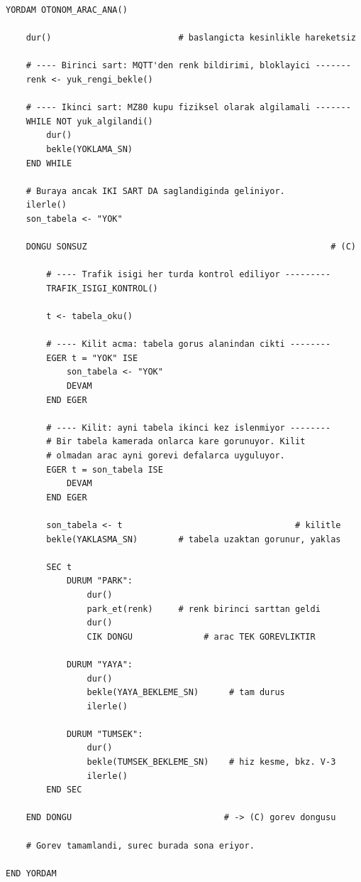 \documentclass[11pt,a4paper]{article}
\begin{document}
\begin{verbatim}
YORDAM OTONOM_ARAC_ANA()

    dur()                         # baslangicta kesinlikle hareketsiz

    # ---- Birinci sart: MQTT'den renk bildirimi, bloklayici -------
    renk <- yuk_rengi_bekle()

    # ---- Ikinci sart: MZ80 kupu fiziksel olarak algilamali -------
    WHILE NOT yuk_algilandi()
        dur()
        bekle(YOKLAMA_SN)
    END WHILE

    # Buraya ancak IKI SART DA saglandiginda geliniyor.
    ilerle()
    son_tabela <- "YOK"

    DONGU SONSUZ                                                # (C)

        # ---- Trafik isigi her turda kontrol ediliyor ---------
        TRAFIK_ISIGI_KONTROL()

        t <- tabela_oku()

        # ---- Kilit acma: tabela gorus alanindan cikti --------
        EGER t = "YOK" ISE
            son_tabela <- "YOK"
            DEVAM
        END EGER

        # ---- Kilit: ayni tabela ikinci kez islenmiyor --------
        # Bir tabela kamerada onlarca kare gorunuyor. Kilit
        # olmadan arac ayni gorevi defalarca uyguluyor.
        EGER t = son_tabela ISE
            DEVAM
        END EGER

        son_tabela <- t                                  # kilitle
        bekle(YAKLASMA_SN)        # tabela uzaktan gorunur, yaklas

        SEC t
            DURUM "PARK":
                dur()
                park_et(renk)     # renk birinci sarttan geldi
                dur()
                CIK DONGU              # arac TEK GOREVLIKTIR

            DURUM "YAYA":
                dur()
                bekle(YAYA_BEKLEME_SN)      # tam durus
                ilerle()

            DURUM "TUMSEK":
                dur()
                bekle(TUMSEK_BEKLEME_SN)    # hiz kesme, bkz. V-3
                ilerle()
        END SEC

    END DONGU                              # -> (C) gorev dongusu

    # Gorev tamamlandi, surec burada sona eriyor.

END YORDAM
\end{verbatim}
\end{document}
